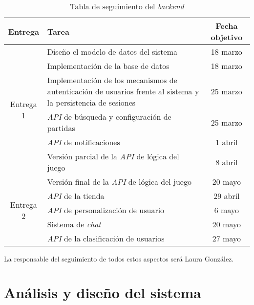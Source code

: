 \documentclass[11pt, a4paper, titlepage]{article}
\begin{document}
\renewcommand{\arraystretch}{1.3}
\begin{table}[hbt!]
\begin{adjustbox}{minipage=18cm, center}
\begin{tabularx}{\textwidth}{|c|X|c| }
\hline
Entrega & Tarea & Fecha objetivo \\\hline
\multirow{6}{*}{Entrega 1}& Diseño el modelo de datos del sistema & 18 marzo\\\cline{2-3}
 & Implementación de la base de datos & 18 marzo \\\cline{2-3}
 & Implementación de los mecanismos de autenticación de usuarios frente al sistema y la persistencia de sesiones & 25 marzo \\\cline{2-3}
 & \textit{API} de búsqueda y configuración de partidas & 25 marzo\\\cline{2-3}
 & \textit{API} de notificaciones &  1 abril \\\cline{2-3}
 & Versión parcial de la \textit{API} de lógica del juego & 8 abril \\\cline{2-3}
\hline
\multirow{5}{*}{Entrega 2} & Versión final de la \textit{API} de lógica del juego & 20 mayo \\\cline{2-3}
& \textit{API} de la tienda & 29 abril \\\cline{2-3}
& \textit{API} de personalización de usuario& 6 mayo \\\cline{2-3}
& Sistema de \textit{chat} & 20 mayo \\\cline{2-3}
& \textit{API} de la clasificación de usuarios &  27 mayo \\\cline{2-3}
\hline
\end{tabularx}
\caption{Tabla de seguimiento del \textit{backend}}
\label{table:backend}
\end{adjustbox}
\end{table}
\FloatBarrier
 
La responsable del seguimiento de todos estos aspectos será Laura González.

\section{Análisis y diseño del sistema}
\end{document}
